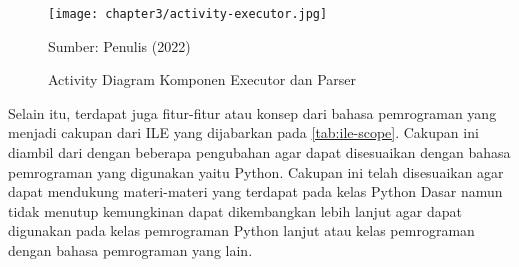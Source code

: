 \begin{figure}[!h]
  \centering
  \texttt{[image: chapter3/activity-executor.jpg]}
  \caption{Activity Diagram Komponen Executor dan Parser} \label{fig:activity-executor}
  Sumber: Penulis (2022)
\end{figure}

Selain itu, terdapat juga fitur-fitur atau konsep dari bahasa pemrograman yang menjadi cakupan dari ILE yang dijabarkan pada \autoref{tab:ile-scope}. Cakupan ini diambil dari \textcite{moons2013pilot} dengan beberapa pengubahan agar dapat disesuaikan dengan bahasa pemrograman yang digunakan yaitu Python. Cakupan ini telah disesuaikan agar dapat mendukung materi-materi yang terdapat pada kelas Python Dasar namun tidak menutup kemungkinan dapat dikembangkan lebih lanjut agar dapat digunakan pada kelas pemrograman Python lanjut atau kelas pemrograman dengan bahasa pemrograman yang lain.


